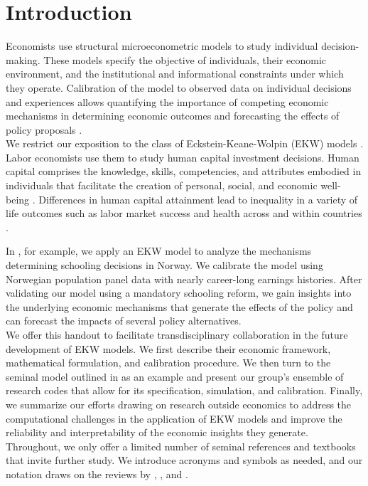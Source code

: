 \section{Introduction}
\noindent Economists use structural microeconometric models to study individual decision-making. These models specify the objective of individuals, their economic environment, and the institutional and informational constraints under which they operate. Calibration of the model to observed data on individual decisions and experiences allows quantifying the importance of competing economic mechanisms in determining economic outcomes and forecasting the effects of policy proposals \citep{Wolpin.2013}.\\

\noindent We restrict our exposition to the class of Eckstein-Keane-Wolpin (EKW) models \citep{Adda.2017, Blundell.2016, Keane.1997}. Labor economists use them to study human capital investment decisions. Human capital comprises the knowledge, skills, competencies, and attributes embodied in individuals that facilitate the creation of personal, social, and economic well-being \citep{Becker.1964}. Differences in human capital attainment lead to inequality in a variety of life outcomes such as labor market success and health across and within countries \citep{OECD.2001}.

In \citet{Bhuller.2018}, for example, we apply an EKW model to analyze the mechanisms determining schooling decisions in Norway. We calibrate the model using Norwegian population panel data with nearly career-long earnings histories. After validating our model using a mandatory schooling reform, we gain insights into the underlying economic mechanisms that generate the effects of the policy and can forecast the impacts of several policy alternatives.\\

\noindent We offer this handout to facilitate transdisciplinary collaboration in the future development of EKW models. We first describe their economic framework, mathematical formulation, and calibration procedure. We then turn to the seminal model outlined in \citet{Keane.1997} as an example and present our group's ensemble of research codes that allow for its specification, simulation, and calibration. Finally, we summarize our efforts drawing on research outside economics to address the computational challenges in the application of EKW models and improve the reliability and interpretability of the economic insights they generate.\\

\noindent Throughout, we only offer a limited number of seminal references and textbooks that invite further study. We introduce acronyms and symbols as needed, and our notation draws on the reviews by \cite{Aguirregabiria.2010}, \cite{Arcidiacono.2011}, and \cite{Puterman.1994}.
